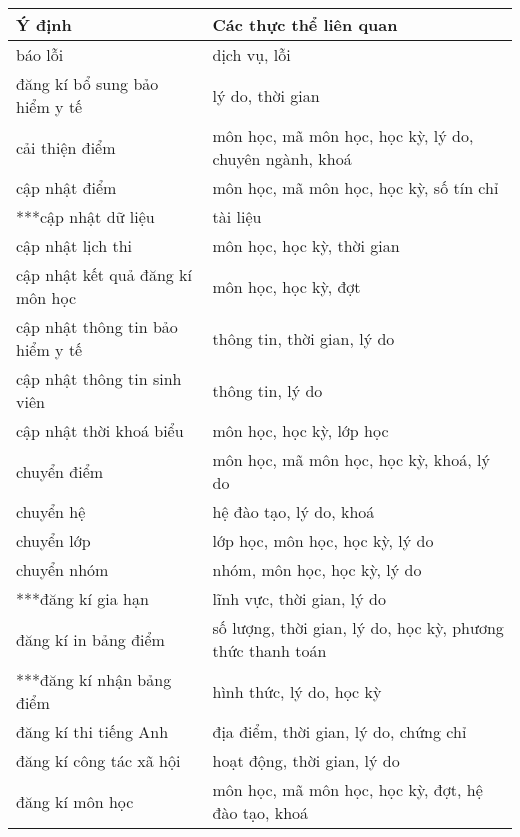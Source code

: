 
\begin{table}[htbp]
    \centering
    \begin{tabular}{|l|l|}
        \hline
        \textbf{Ý định} & \textbf{Các thực thể liên quan}  \\
        \hline
        báo lỗi & dịch vụ, lỗi \\
        \hline
        đăng kí bổ sung bảo hiểm y tế & lý do, thời gian \\
        \hline
        cải thiện điểm & môn học, mã môn học, học kỳ, lý do, chuyên ngành, khoá \\
        \hline
        cập nhật điểm & môn học, mã môn học, học kỳ, số tín chỉ \\
        \hline
        ***cập nhật dữ liệu & tài liệu \\
        \hline
        cập nhật lịch thi & môn học, học kỳ, thời gian \\
        \hline
        cập nhật kết quả đăng kí môn học & môn học, học kỳ, đợt \\
        \hline
        cập nhật thông tin bảo hiểm y tế & thông tin, thời gian, lý do \\
        \hline
        cập nhật thông tin sinh viên & thông tin, lý do \\
        \hline
        cập nhật thời khoá biểu & môn học, học kỳ, lớp học \\
        \hline
        chuyển điểm & môn học, mã môn học, học kỳ, khoá, lý do \\
        \hline
        chuyển hệ & hệ đào tạo, lý do, khoá \\
        \hline
        chuyển lớp & lớp học, môn học, học kỳ, lý do \\
        \hline
        chuyển nhóm & nhóm, môn học, học kỳ, lý do \\
        \hline
        ***đăng kí gia hạn & lĩnh vực, thời gian, lý do \\
        \hline
        đăng kí in bảng điểm & số lượng, thời gian, lý do, học kỳ, phương thức thanh toán \\
        \hline
        ***đăng kí nhận bảng điểm & hình thức, lý do, học kỳ \\
        \hline
        đăng kí thi tiếng Anh & địa điểm, thời gian, lý do, chứng chỉ \\
        \hline
        đăng kí công tác xã hội & hoạt động, thời gian, lý do \\
        \hline
        đăng kí môn học & môn học, mã môn học, học kỳ, đợt, hệ đào tạo, khoá \\

\end{tabular}
\end{table}
